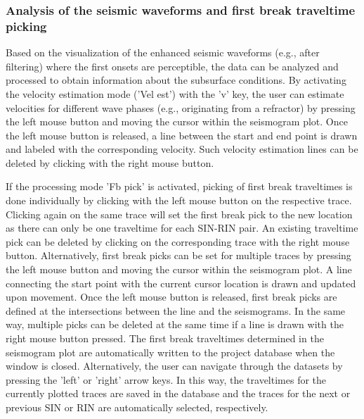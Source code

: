 \documentclass[a4paper,fleqn]{cas-sc}
\begin{document}
\subsubsection{Analysis of the seismic waveforms and first break traveltime picking}

Based on the visualization of the enhanced seismic waveforms (e.g., after filtering) where the first onsets are perceptible, the data can be analyzed and processed to obtain information about the subsurface conditions. By activating the velocity estimation mode ('Vel est') with the 'v' key, the user can estimate velocities for different wave phases (e.g., originating from a refractor) by pressing the left mouse button and moving the cursor within the seismogram plot. Once the left mouse button is released, a line between the start and end point is drawn and labeled with the corresponding velocity. Such velocity estimation lines can be deleted by clicking with the right mouse button.

If the processing mode 'Fb pick' is activated, picking of first break traveltimes is done individually by clicking with the left mouse button on the respective trace. Clicking again on the same trace will set the first break pick to the new location as there can only be one traveltime for each SIN-RIN pair. An existing traveltime pick can be deleted by clicking on the corresponding trace with the right mouse button. Alternatively, first break picks can be set for multiple traces by pressing the left mouse button and moving the cursor within the seismogram plot. A line connecting the start point with the current cursor location is drawn and updated upon movement. Once the left mouse button is released, first break picks are defined at the intersections between the line and the seismograms. In the same way, multiple picks can be deleted at the same time if a line is drawn with the right mouse button pressed. The first break traveltimes determined in the seismogram plot are automatically written to the project database when the window is closed. Alternatively, the user can navigate through the datasets by pressing the 'left' or 'right' arrow keys. In this way, the traveltimes for the currently plotted traces are saved in the database and the traces for the next or previous SIN or RIN are automatically selected, respectively.  
\end{document}
